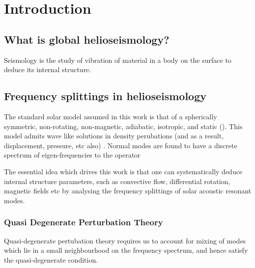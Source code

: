 
\chapter{Introduction}  %

\ifpdf
    \graphicspath{{Chapter1/Figs/Raster/}{Chapter1/Figs/PDF/}{Chapter1/Figs/}}
\else
    \graphicspath{{Chapter1/Figs/Vector/}{Chapter1/Figs/}}
\fi


\section{What is global helioseismology?} %
Seismology is the study of vibration of material in a body on the surface to deduce its internal structure.



\section{Frequency splittings in helioseismology} %

The standard solar model assumed in this work is that of a spherically symmetric, non-rotating, non-magnetic, adiabatic, isotropic, and static (\snr). This \snr model admits wave like solutions in density perubations (and as a result, displacement, pressure, etc also) \cite{jcd_notes}. Normal modes are found to have a discrete spectrum of eigen-frequencies to the operator


The essential idea which drives this work is that one can systematically deduce internal structure parameters, such as convective flow, differential rotation, magnetic fields etc by analysing the frequency splittings of solar acoustic resonant modes. 

\subsection{Quasi Degenerate Perturbation Theory}

Quasi-degenerate pertubation theory requires us to account for mixing of modes which lie in a small neighbourhood on the frequency spectrum, and hence satisfy the quasi-degenerate condition.

